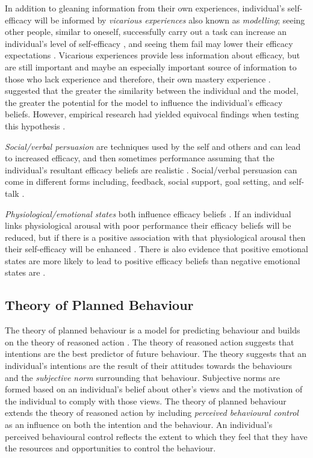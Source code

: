 \documentclass[
  12pt,
  a4paper,
]{book}
\begin{document}
In addition to gleaning information from their own experiences, individual's self-efficacy will be informed by \emph{vicarious experiences} also known as \emph{modelling}; seeing other people, similar to oneself, successfully carry out a task can increase an individual's level of self-efficacy \citep{Bandura1982, Lirgg1991}, and seeing them fail may lower their efficacy expectations \citep{Brown1978}. Vicarious experiences provide less information about efficacy, but are still important \citep{McCullagh2001} and maybe an especially important source of information to those who lack experience and therefore, their own mastery experience \citep{Weinberg2014}. \citet{Bandura1986} suggested that the greater the similarity between the individual and the model, the greater the potential for the model to influence the individual's efficacy beliefs. However, empirical research had yielded equivocal findings when testing this hypothesis \citep[cf.~][]{Samson2011}.

\emph{Social/verbal persuasion} are techniques used by the self and others and can lead to increased efficacy, and then sometimes performance assuming that the individual's resultant efficacy beliefs are realistic \citep{Bandura1982}. Social/verbal persuasion can come in different forms including, feedback, social support, goal setting, and self-talk \citep{Samson2011}.

\emph{Physiological/emotional states} both influence efficacy beliefs \citep{Bandura1977, Bandura1982}. If an individual links physiological arousal with poor performance their efficacy beliefs will be reduced, but if there is a positive association with that physiological arousal then their self-efficacy will be enhanced \citep{Hauck2008, Jones1995, Jones1992}. There is also evidence that positive emotional states are more likely to lead to positive efficacy beliefs than negative emotional states are \citep{Maddux1995, Martin2002}.

\hypertarget{theory-of-planned-behaviour}{%
\subsection{Theory of Planned Behaviour}\label{theory-of-planned-behaviour}}

The theory of planned behaviour \citep{Ajzen1991, Ajzen1986} is a model for predicting behaviour and builds on the theory of reasoned action \citep{Ajzen1980}. The theory of reasoned action suggests that intentions are the best predictor of future behaviour. The theory suggests that an individual's intentions are the result of their attitudes towards the behaviours and the \emph{subjective norm} surrounding that behaviour. Subjective norms are formed based on an individual's belief about other's views and the motivation of the individual to comply with those views. The theory of planned behaviour extends the theory of reasoned action by including \emph{perceived behavioural control} as an influence on both the intention and the behaviour. An individual's perceived behavioural control reflects the extent to which they feel that they have the resources and opportunities to control the behaviour.
\end{document}
